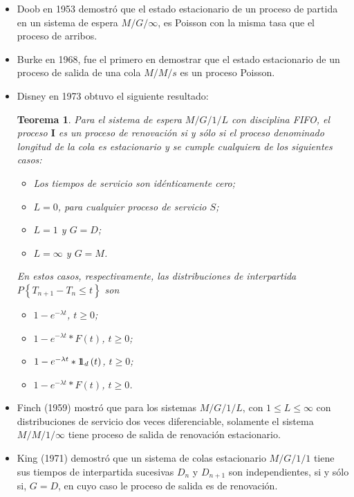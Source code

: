 \documentclass{article}
\newtheorem{Teo}{Teorema}[section]
\newcommand{\indora}{\mbox{$1$\hspace{-0.8ex}$1$}}
\numberwithin{equation}{section}
\begin{document}
\begin{itemize}
\item Doob en 1953 demostr\'o que el estado estacionario de un proceso de partida en un sistema de espera $M/G/\infty$, es Poisson con la misma tasa que el proceso de arribos.

\item Burke en 1968, fue el primero en demostrar que el estado estacionario de un proceso de salida de una cola $M/M/s$ es un proceso Poisson.

\item Disney en 1973 obtuvo el siguiente resultado:

\begin{Teo}
Para el sistema de espera $M/G/1/L$ con disciplina FIFO, el proceso $\textbf{I}$ es un proceso de renovaci\'on si y s\'olo si el proceso denominado longitud de la cola es estacionario y se cumple cualquiera de los siguientes casos:

\begin{itemize}
\item[a)] Los tiempos de servicio son id\'enticamente cero;
\item[b)] $L=0$, para cualquier proceso de servicio $S$;
\item[c)] $L=1$ y $G=D$;
\item[d)] $L=\infty$ y $G=M$.
\end{itemize}
En estos casos, respectivamente, las distribuciones de interpartida $P\left\{T_{n+1}-T_{n}\leq t\right\}$ son


\begin{itemize}
\item[a)] $1-e^{-\lambda t}$, $t\geq0$;
\item[b)] $1-e^{-\lambda t}*F\left(t\right)$, $t\geq0$;
\item[c)] $1-e^{-\lambda t}*\indora_{d}\left(t\right)$, $t\geq0$;
\item[d)] $1-e^{-\lambda t}*F\left(t\right)$, $t\geq0$.
\end{itemize}
\end{Teo}


\item Finch (1959) mostr\'o que para los sistemas $M/G/1/L$, con $1\leq L\leq \infty$ con distribuciones de servicio dos veces diferenciable, solamente el sistema $M/M/1/\infty$ tiene proceso de salida de renovaci\'on estacionario.

\item King (1971) demostr\'o que un sistema de colas estacionario $M/G/1/1$ tiene sus tiempos de interpartida sucesivas $D_{n}$ y $D_{n+1}$ son independientes, si y s\'olo si, $G=D$, en cuyo caso le proceso de salida es de renovaci\'on.


\end{itemize}
\end{document}
